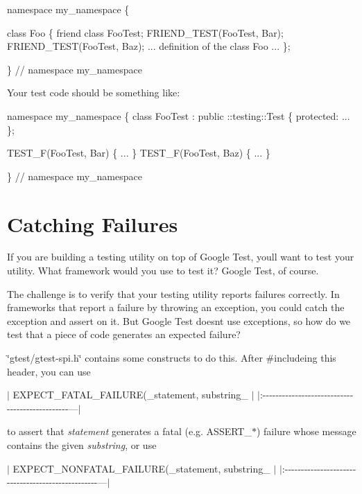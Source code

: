 \begin{DoxyCode}
namespace my\_namespace \{

class Foo \{
  friend class FooTest;
  FRIEND\_TEST(FooTest, Bar);
  FRIEND\_TEST(FooTest, Baz);
  ...
  definition of the class Foo
  ...
\};

\}  // namespace my\_namespace
\end{DoxyCode}


Your test code should be something like\+:


\begin{DoxyCode}
namespace my\_namespace \{
class FooTest : public ::testing::Test \{
 protected:
  ...
\};

TEST\_F(FooTest, Bar) \{ ... \}
TEST\_F(FooTest, Baz) \{ ... \}

\}  // namespace my\_namespace
\end{DoxyCode}


\section*{Catching Failures}

If you are building a testing utility on top of Google Test, you\textquotesingle{}ll want to test your utility. What framework would you use to test it? Google Test, of course.

The challenge is to verify that your testing utility reports failures correctly. In frameworks that report a failure by throwing an exception, you could catch the exception and assert on it. But Google Test doesn\textquotesingle{}t use exceptions, so how do we test that a piece of code generates an expected failure?

{\ttfamily \char`\"{}gtest/gtest-\/spi.\+h\char`\"{}} contains some constructs to do this. After {\ttfamily \#include}ing this header, you can use

$\vert$ {\ttfamily E\+X\+P\+E\+C\+T\+\_\+\+F\+A\+T\+A\+L\+\_\+\+F\+A\+I\+L\+U\+RE(}\+\_\+statement, substring\+\_\+{\ttfamily );} $\vert$ $\vert$\+:-\/-\/-\/-\/-\/-\/-\/-\/-\/-\/-\/-\/-\/-\/-\/-\/-\/-\/-\/-\/-\/-\/-\/-\/-\/-\/-\/-\/-\/-\/-\/-\/-\/-\/-\/-\/-\/-\/-\/-\/-\/-\/-\/-\/-\/-\/-\/---$\vert$

to assert that {\itshape statement} generates a fatal (e.\+g. {\ttfamily A\+S\+S\+E\+R\+T\+\_\+$\ast$}) failure whose message contains the given {\itshape substring}, or use

$\vert$ {\ttfamily E\+X\+P\+E\+C\+T\+\_\+\+N\+O\+N\+F\+A\+T\+A\+L\+\_\+\+F\+A\+I\+L\+U\+RE(}\+\_\+statement, substring\+\_\+{\ttfamily );} $\vert$ $\vert$\+:-\/-\/-\/-\/-\/-\/-\/-\/-\/-\/-\/-\/-\/-\/-\/-\/-\/-\/-\/-\/-\/-\/-\/-\/-\/-\/-\/-\/-\/-\/-\/-\/-\/-\/-\/-\/-\/-\/-\/-\/-\/-\/-\/-\/-\/-\/-\/-\/-\/-\/---$\vert$

